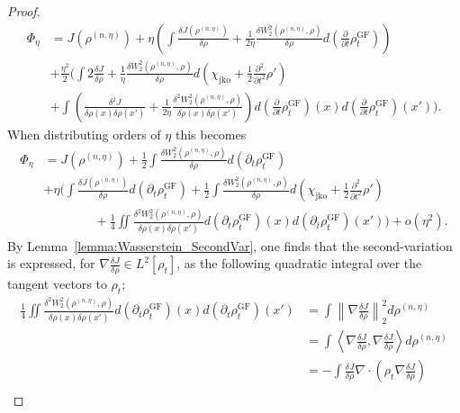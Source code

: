 \documentclass[reqno,11pt,letterpaper]{amsart}
\theoremstyle{plain}
\theoremstyle{definition}
\theoremstyle{remark}
\newcommand{\wass}{\mathrm{GF}}
\newcommand{\wagrad}{\nabla \frac{\delta J}{\delta \rho}}
\newcommand{\wadel}{\frac{\delta J}{\delta \rho}}
\newcommand{\jkoreg}{\chi_{\mathrm{jko}}}
\begin{document}
\begin{proof}
\begin{align*}
    \Phi_{\eta} &= J(\rho^{(n,\eta)})  + \eta \left(
    \int \frac{\delta J (\rho^{(n,\eta)})}{\delta \rho} + \frac{1}{2 \eta}\frac{\delta W_{2}^{2} (\rho^{(n,\eta)}, \rho)}{\delta \rho} d\left(\frac{\partial }{\partial t} \rho^{\wass}_{t}\right)
    \right) \\
    & + \frac{\eta^{2}}{2} \biggl(
    \int 2\frac{\delta J}{ \delta \rho} + \frac{1}{\eta} \frac{\delta W_{2}^{2}(\rho^{(n, \eta)}, \rho)}{ \delta \rho} d\left( \jkoreg + \frac{1}{2} \frac{\partial^{2} }{\partial t^{2}} \rho'
    \right) \\
    & +
    \int \left( \frac{\delta^{2} J}{ \delta \rho(x) \delta \rho(x')} + \frac{1}{2 \eta}\frac{\delta^{2} W_{2}^{2}(\rho^{(n, \eta)}, \rho)}{ \delta \rho(x) \delta \rho(x')} \right) d\left(\frac{\partial }{\partial t} \rho^{\wass}_{t}\right)(x)d\left(\frac{\partial }{\partial t} \rho^{\wass}_{t}\right)(x') 
    \biggr).
\end{align*}
When distributing orders of $\eta$ this becomes
\begin{align*}
\Phi_{\eta} &= J(\rho^{(n,\eta)}) + \frac{1}{2} \int \frac{\delta W_{2}^{2} (\rho^{(n,\eta)}, \rho)}{\delta \rho} d(\partial_{t} \rho^{\wass}_{t}) \\
&+ \eta \biggl( \int \frac{\delta J (\rho^{(n,\eta)})}{\delta \rho} d(\partial_{t} \rho^{\wass}_{t}) + \frac{1}{2} \int \frac{\delta W_{2}^{2}(\rho^{(n, \eta)}, \rho)}{ \delta \rho} d\left( \jkoreg + \frac{1}{2} \frac{\partial^{2} }{\partial t^{2}} \rho'
    \right) \\
    &\qquad \qquad + \frac{1}{4} \iint  \frac{\delta^{2} W_{2}^{2}(\rho^{(n, \eta)}, \rho)}{ \delta \rho(x) \delta \rho(x')}  d(\partial_{t} \rho^{\wass}_{t})(x) d(\partial_{t} \rho^{\wass}_{t})(x') \biggr) + o(\eta^{2}).
\end{align*}
By Lemma~\ref{lemma:Wasserstein_SecondVar}, one finds that the second-variation is expressed, for $\wagrad \in L^{2}[\rho_{t}]$, as the following quadratic integral over the tangent vectors to $\rho_{t}$;
\begin{align*}
    \frac{1}{4}\iint  \frac{\delta^{2} W_{2}^{2}(\rho^{(n, \eta)}, \rho)}{ \delta \rho(x) \delta \rho(x')}  d(\partial_{t} \rho^{\wass}_{t})(x) d(\partial_{t} \rho^{\wass}_{t})(x') & = \int \left\lVert \wagrad \right\rVert_{2}^{2} d \rho^{(n,\eta)} \\
    &= \int \left\langle \wagrad, \wagrad
    \right\rangle d \rho^{(n,\eta)}\\
    &= -\int \wadel \nabla \cdot (\rho_t \wagrad )\\

\end{align*}
\end{proof}
\end{document}
